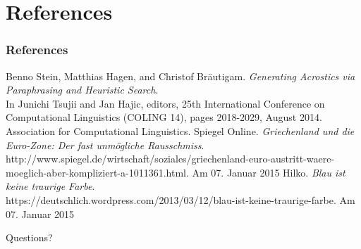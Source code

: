 \documentclass{beamer}
\begin{document}
\section{References}

\begin{frame}
\frametitle{References}
\scriptsize
\begin{thebibliography}{1}
	Benno Stein, Matthias Hagen, and Christof Bräutigam. \emph{Generating Acrostics via Paraphrasing and Heuristic Search}. \\
	In Junichi Tsujii and Jan Hajic, editors, 25th International Conference on Computational Linguistics (COLING 14), pages 2018-2029, August 2014. Association for Computational Linguistics.
	Spiegel Online. \emph{Griechenland und die Euro-Zone: Der fast unmögliche Rausschmiss}. \\
	http://www.spiegel.de/wirtschaft/soziales/griechenland-euro-austritt-waere-moeglich-aber-kompliziert-a-1011361.html. Am 07. Januar 2015
	Hilko. \emph{Blau ist keine traurige Farbe}. \\
	https://deutschlich.wordpress.com/2013/03/12/blau-ist-keine-traurige-farbe. Am 07. Januar 2015
\end{thebibliography}
\end{frame}

\begin{frame}
\Huge{\centerline{Questions?}}
\end{frame}

\end{document}
